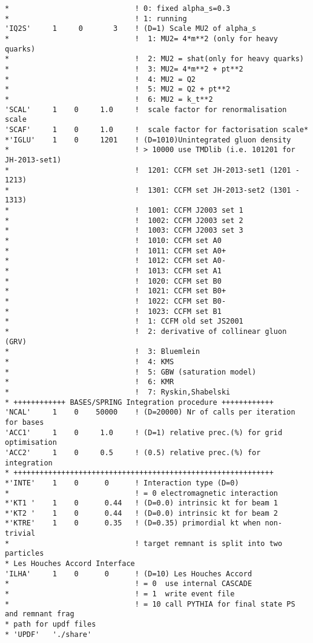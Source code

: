 \documentclass[11pt]{article} \usepackage{mystyle-new}
\begin{document}
\begin{footnotesize}
\begin{verbatim}
*                             ! 0: fixed alpha_s=0.3 
*                             ! 1: running
'IQ2S'     1     0       3    ! (D=1) Scale MU2 of alpha_s
*                             !  1: MU2= 4*m**2 (only for heavy quarks)
*                             !  2: MU2 = shat(only for heavy quarks)
*                             !  3: MU2= 4*m**2 + pt**2
*                             !  4: MU2 = Q2
*                             !  5: MU2 = Q2 + pt**2
*                             !  6: MU2 = k_t**2
'SCAL'     1    0     1.0     !  scale factor for renormalisation scale
'SCAF'     1    0     1.0     !  scale factor for factorisation scale*
*'IGLU'    1    0     1201    ! (D=1010)Unintegrated gluon density 
*                             ! > 10000 use TMDlib (i.e. 101201 for JH-2013-set1)
*                             !  1201: CCFM set JH-2013-set1 (1201 - 1213)
*                             !  1301: CCFM set JH-2013-set2 (1301 - 1313)
*                             !  1001: CCFM J2003 set 1 
*                             !  1002: CCFM J2003 set 2 
*                             !  1003: CCFM J2003 set 3 
*                             !  1010: CCFM set A0
*                             !  1011: CCFM set A0+
*                             !  1012: CCFM set A0-
*                             !  1013: CCFM set A1
*                             !  1020: CCFM set B0
*                             !  1021: CCFM set B0+
*                             !  1022: CCFM set B0-
*                             !  1023: CCFM set B1
*                             !  1: CCFM old set JS2001
*                             !  2: derivative of collinear gluon (GRV)
*                             !  3: Bluemlein
*                             !  4: KMS
*                             !  5: GBW (saturation model)
*                             !  6: KMR
*                             !  7: Ryskin,Shabelski
* ++++++++++++ BASES/SPRING Integration procedure ++++++++++++
'NCAL'     1    0    50000    ! (D=20000) Nr of calls per iteration for bases
'ACC1'     1    0     1.0     ! (D=1) relative prec.(%) for grid optimisation
'ACC2'     1    0     0.5     ! (0.5) relative prec.(%) for integration
* ++++++++++++++++++++++++++++++++++++++++++++++++++++++++++++
*'INTE'    1    0      0      ! Interaction type (D=0)
*                             ! = 0 electromagnetic interaction
*'KT1 '    1    0      0.44   ! (D=0.0) intrinsic kt for beam 1
*'KT2 '    1    0      0.44   ! (D=0.0) intrinsic kt for beam 2
*'KTRE'    1    0      0.35   ! (D=0.35) primordial kt when non-trivial 
*                             ! target remnant is split into two particles
* Les Houches Accord Interface
'ILHA'     1    0      0      ! (D=10) Les Houches Accord  
*                             ! = 0  use internal CASCADE
*                             ! = 1  write event file
*                             ! = 10 call PYTHIA for final state PS and remnant frag
* path for updf files
* 'UPDF'   './share'
\end{verbatim}
\end{footnotesize}
\end{document}
